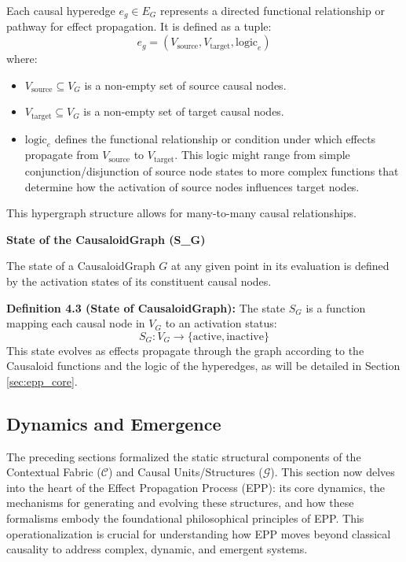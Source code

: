 Each causal hyperedge \( e_g \in E_G \) represents a directed functional relationship or pathway for effect propagation. It is defined as a tuple:
\[ e_g = (V_{\text{source}}, V_{\text{target}}, \text{logic}_e) \]
where:
\begin{itemize}
    \item \( V_{\text{source}} \subseteq V_G \) is a non-empty set of source causal nodes.
    \item \( V_{\text{target}} \subseteq V_G \) is a non-empty set of target causal nodes.
    \item \( \text{logic}_e \) defines the functional relationship or condition under which effects propagate from \(V_{\text{source}}\) to \(V_{\text{target}}\). This logic might range from simple conjunction/disjunction of source node states to more complex functions that determine how the activation of source nodes influences target nodes.
\end{itemize}
This hypergraph structure allows for many-to-many causal relationships.


\textbf{State of the CausaloidGraph (S\_G)}

The state of a CausaloidGraph \( G \) at any given point in its evaluation is defined by the activation states of its constituent causal nodes.

\textbf{Definition 4.3 (State of CausaloidGraph):} The state \( S_G \) is a function mapping each causal node in \(V_G\) to an activation status:
\[ S_G: V_G \to \{\text{active}, \text{inactive}\} \]
This state evolves as effects propagate through the graph according to the Causaloid functions and the logic of the hyperedges, as will be detailed in Section \ref{sec:epp_core}.


\subsection[Effect Propagation, Dynamics, and Emergence]{Dynamics and Emergence}
\label{sec:formalization_epp}

The preceding sections formalized the static structural components of the Contextual Fabric (\(\mathcal{C}\)) and Causal Units/Structures (\(\mathcal{G}\)). This section now delves into the heart of the Effect Propagation Process (EPP): its core dynamics, the mechanisms for generating and evolving these structures, and how these formalisms embody the foundational philosophical principles of EPP. This operationalization is crucial for understanding how EPP moves beyond classical causality to address complex, dynamic, and emergent systems.

